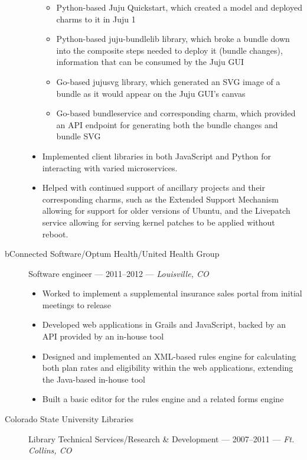 \documentclass[letterpaper]{memoir}
\begin{document}
\begin{description}
\begin{itemize}
        \begin{itemize}
            \tightlist
            \item
            Python-based Juju Quickstart, which created a model and deployed charms to it in Juju 1
            \item
            Python-based juju-bundlelib library, which broke a bundle down into the composite steps needed to deploy it (bundle changes), information that can be consumed by the Juju GUI
            \item
            Go-based jujusvg library, which generated an SVG image of a bundle as it would appear on the Juju GUI's canvas
            \item
            Go-based bundleservice and corresponding charm, which provided an API endpoint for generating both the bundle changes and bundle SVG
        \end{itemize}
        \item
        Implemented client libraries in both JavaScript and Python for interacting with varied microservices.
        \item
        Helped with continued support of ancillary projects and their corresponding charms, such as the Extended Support Mechanism allowing for support for older versions of Ubuntu, and the Livepatch service allowing for serving kernel patches to be applied without reboot.
    \end{itemize}
    \item[bConnected Software/Optum Health/United Health Group]
    Software engineer --- 2011--2012 --- \emph{Louisville, CO}

    \begin{itemize}
        \tightlist
        \item
        Worked to implement a supplemental insurance sales portal from initial meetings to release
        \item
        Developed web applications in Grails and JavaScript, backed by an API provided by an in-house tool
        \item
        Designed and implemented an XML-based rules engine for calculating both plan rates and eligibility within the web applications, extending the Java-based in-house tool
        \item
        Built a basic editor for the rules engine and a related forms engine
    \end{itemize}
    \item[Colorado State University Libraries]
    Library Technical Services/Research \& Development --- 2007--2011 --- \emph{Ft. Collins, CO}


\end{description}
\end{document}
